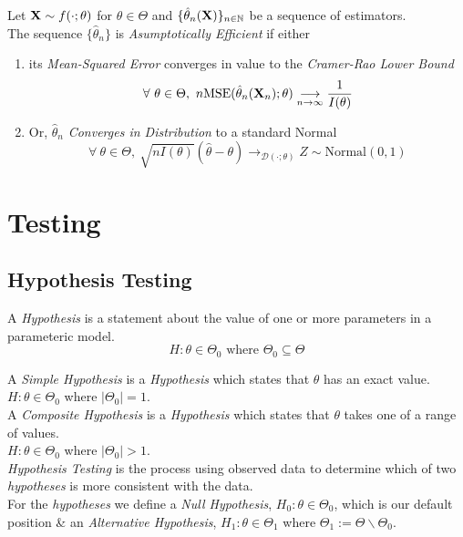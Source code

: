 \documentclass[11pt,a4paper]{article}
\begin{document}
Let $\textbf{X}\sim f(\cdot;\theta)$ for $\theta\in\Theta$ and $\{\hat\theta_n(\textbf{X})\}_{n\in\mathbb{N}}$  be a sequence of estimators.\\
The sequence $\{\hat\theta_n\}$ is \textit{Asumptotically Efficient} if either
\begin{enumerate}
	\item its \textit{Mean-Squared Error} converges in value to the \textit{Cramer-Rao Lower Bound}
	$$\forall\ \theta\in\Theta,\ n\text{MSE}(\hat\theta_n(\X_n);\theta)\underset{n\to\infty}{\longrightarrow}\frac{1}{I(\theta)}$$
	\item Or, $\hat\theta_n$ \textit{Converges in Distribution} to a standard Normal
	$$\forall\ \theta\in\Theta,\ \sqrt{nI(\theta)}(\hat\theta-\theta)\to_{\mathcal{D}(\cdot;\theta)}Z\sim\text{Normal}(0,1)$$
\end{enumerate}


\section{Testing}

\subsection{Hypothesis Testing}

A \textit{Hypothesis} is a statement about the value of one or more parameters in a parameteric model.
$$H:\theta\in\Theta_0\text{ where }\Theta_0\subseteq\Theta$$

A \textit{Simple Hypothesis} is a \textit{Hypothesis} which states that $\theta$ has an exact value.\\
\ie $H:\theta\in\Theta_0$ where $|\Theta_0|=1$.\\

A \textit{Composite Hypothesis} is a \textit{Hypothesis} which states that $\theta$ takes one of a range of values.\\
\ie $H:\theta\in\Theta_0$ where $|\Theta_0|>1$.\\

\textit{Hypothesis Testing} is the process using observed data to determine which of two \textit{hypotheses} is more consistent with the data.\\
For the \textit{hypotheses} we define a \textit{Null Hypothesis}, $H_0:\theta\in\Theta_0$, which is our default position \& an \textit{Alternative Hypothesis}, $H_1:\theta\in\Theta_1$ where $\Theta_1:=\Theta\backslash\Theta_0$.\\
\end{document}
